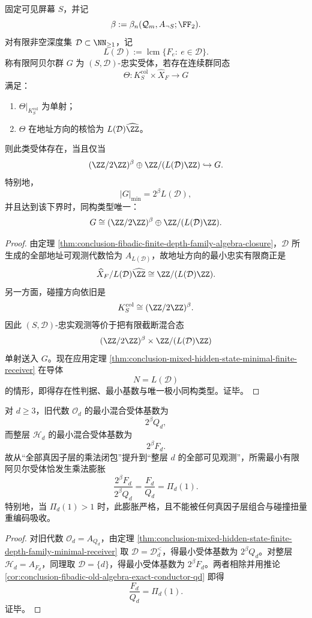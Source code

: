 \begin{theorem}[任意有限深度族的混合隐藏态最小受体律]\label{thm:conclusion-mixed-hidden-state-finite-depth-family-minimal-receiver}
固定可见屏幕 \(S\)，并记
\[
\beta:=\beta_n(\mathcal Q_m,A_{\neg S};\FF_2).
\]
对有限非空深度集 \(\mathcal D\subset \NN_{\ge 1}\)，记
\[
L(\mathcal D):=\operatorname{lcm}\{F_e:\ e\in \mathcal D\}.
\]
称有限阿贝尔群 \(G\) 为 \((S,\mathcal D)\)-忠实受体，若存在连续群同态
\[
\Theta:K_S^{\mathrm{col}}\times \widehat X_F\to G
\]
满足：
\begin{enumerate}
  \item \(\Theta|_{K_S^{\mathrm{col}}}\) 为单射；
  \item \(\Theta\) 在地址方向的核恰为 \(L(\mathcal D)\widehat{\ZZ}\)。
\end{enumerate}
则此类受体存在，当且仅当
\[
(\ZZ/2\ZZ)^\beta\oplus \ZZ/(L(\mathcal D)\ZZ)\hookrightarrow G.
\]
特别地，
\[
|G|_{\min}=2^\beta L(\mathcal D),
\]
并且达到该下界时，同构类型唯一：
\[
G\cong (\ZZ/2\ZZ)^\beta\oplus \ZZ/(L(\mathcal D)\ZZ).
\]
\end{theorem}
\begin{proof}
由定理 \ref{thm:conclusion-fibadic-finite-depth-family-algebra-closure}，\(\mathcal D\) 所生成的全部地址可观测代数恰为 \(A_{L(\mathcal D)}\)，故地址方向的最小忠实有限商正是
\[
\widehat X_F/L(\mathcal D)\widehat{\ZZ}\cong \ZZ/(L(\mathcal D)\ZZ).
\]
另一方面，碰撞方向依旧是
\[
K_S^{\mathrm{col}}\cong (\ZZ/2\ZZ)^\beta.
\]
因此 \((S,\mathcal D)\)-忠实观测等价于把有限截断混合态
\[
(\ZZ/2\ZZ)^\beta\times \ZZ/(L(\mathcal D)\ZZ)
\]
单射送入 \(G\)。现在应用定理 \ref{thm:conclusion-mixed-hidden-state-minimal-finite-receiver} 在导体
\[
N=L(\mathcal D)
\]
的情形，即得存在性判据、最小基数与唯一极小同构类型。证毕。
\end{proof}

\begin{corollary}\label{cor:conclusion-fibadic-old-to-full-depth-receiver-inflation}
对 \(d\ge 3\)，旧代数 \(\mathcal O_d\) 的最小混合受体基数为
\[
2^\beta Q_d,
\]
而整层 \(\mathcal H_d\) 的最小混合受体基数为
\[
2^\beta F_d.
\]
故从“全部真因子层的乘法闭包”提升到“整层 \(d\) 的全部可见观测”，所需最小有限阿贝尔受体恰发生乘法膨胀
\[
\frac{2^\beta F_d}{2^\beta Q_d}
=
\frac{F_d}{Q_d}
=
\Pi_d(1).
\]
特别地，当 \(\Pi_d(1)>1\) 时，此膨胀严格，且不能被任何真因子层组合与碰撞扭量重编码吸收。
\end{corollary}
\begin{proof}
对旧代数 \(\mathcal O_d=A_{Q_d}\)，由定理 \ref{thm:conclusion-mixed-hidden-state-finite-depth-family-minimal-receiver} 取 \(\mathcal D=\mathcal D_d^{<}\)，得最小受体基数为 \(2^\beta Q_d\)。对整层 \(\mathcal H_d=A_{F_d}\)，同理取 \(\mathcal D=\{d\}\)，得最小受体基数为 \(2^\beta F_d\)。两者相除并用推论 \ref{cor:conclusion-fibadic-old-algebra-exact-conductor-qd} 即得
\[
\frac{F_d}{Q_d}=\Pi_d(1).
\]
证毕。
\end{proof}

